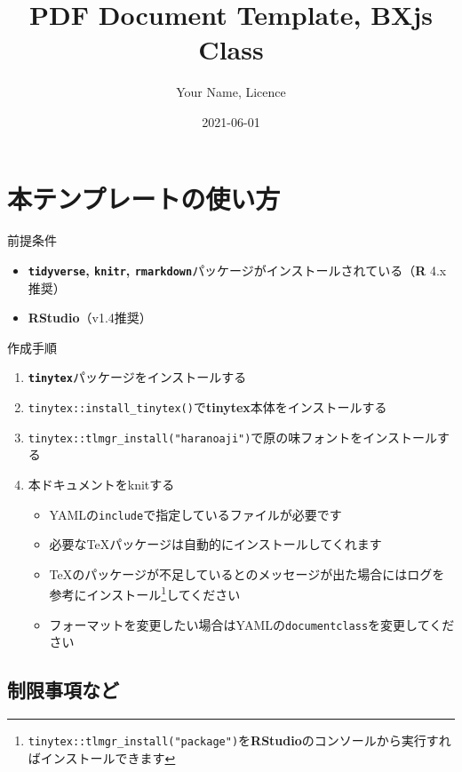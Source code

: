 \documentclass[
  12pt,
  a4paper,xelatex,ja=standard]{bxjsslide}
\title{PDF Document Template, BXjs Class}
\author{Your Name, Licence}
\date{2021-06-01}
\providecommand{\tightlist}{%
  \setlength{\itemsep}{0pt}\setlength{\parskip}{0pt}}
\begin{document}
\maketitle

\hypertarget{ux672cux30c6ux30f3ux30d7ux30ecux30fcux30c8ux306eux4f7fux3044ux65b9}{%
\section{本テンプレートの使い方}\label{ux672cux30c6ux30f3ux30d7ux30ecux30fcux30c8ux306eux4f7fux3044ux65b9}}

前提条件

\begin{itemize}
\tightlist
\item
  \textbf{\texttt{tidyverse}, \texttt{knitr},
  \texttt{rmarkdown}}パッケージがインストールされている（\textbf{R}
  4.x推奨）
\item
  \textbf{RStudio}（v1.4推奨）
\end{itemize}

作成手順

\begin{enumerate}
\def\labelenumi{\arabic{enumi}.}
\tightlist
\item
  \textbf{\texttt{tinytex}}パッケージをインストールする
\item
  \texttt{tinytex::install\_tinytex()}で\textbf{tinytex}本体をインストールする
\item
  \texttt{tinytex::tlmgr\_install("haranoaji")}で原の味フォントをインストールする
\item
  本ドキュメントをknitする

  \begin{itemize}
  \tightlist
  \item
    YAMLの\texttt{include}で指定しているファイルが必要です
  \item
    必要なTeXパッケージは自動的にインストールしてくれます
  \item
    TeXのパッケージが不足しているとのメッセージが出た場合にはログを参考にインストール\footnote{\texttt{tinytex::tlmgr\_install("package")}を\textbf{RStudio}のコンソールから実行すればインストールできます}してください
  \item
    フォーマットを変更したい場合はYAMLの\texttt{documentclass}を変更してください
  \end{itemize}
\end{enumerate}

\newpage

\hypertarget{ux5236ux9650ux4e8bux9805ux306aux3069}{%
\subsection{制限事項など}\label{ux5236ux9650ux4e8bux9805ux306aux3069}}
\end{document}

